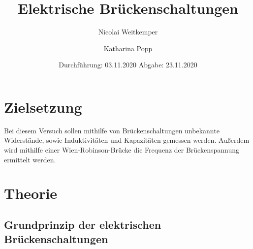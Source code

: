 

\subject{V302}
\title{Elektrische Brückenschaltungen}
\author{Nicolai Weitkemper \and Katharina Popp}
\date{
    Durchführung: 03.11.2020
    \hspace{3em}
    Abgabe: 23.11.2020 %
}



\maketitle
\thispagestyle{empty}
\tableofcontents
\newpage

\section{Zielsetzung} \label{sec:Ziel}

Bei diesem Versuch sollen mithilfe von Brückenschaltungen unbekannte Widerstände, sowie Induktivitäten und Kapazitäten gemessen werden.
Außerdem wird mithilfe einer Wien-Robinson-Brücke die Frequenz der Brückenspannung ermittelt werden. 

\section{Theorie} \label{sec:Theorie}

\subsection{Grundprinzip der elektrischen Brückenschaltungen}

